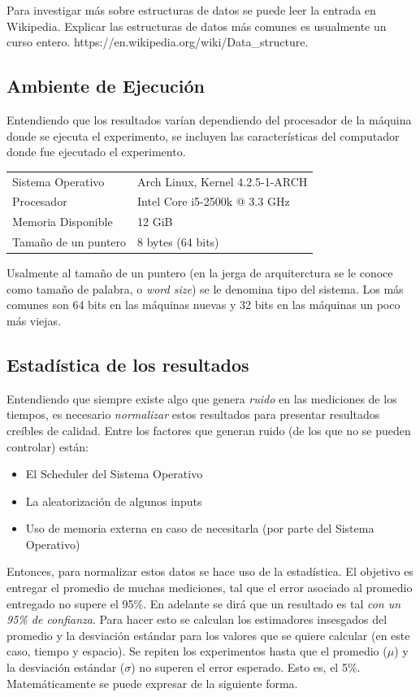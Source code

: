 \documentclass[12pt,letterpaper]{report}
\begin{document}
Para investigar más sobre estructuras de datos se puede leer la entrada en Wikipedia. Explicar las estructuras de datos más comunes es usualmente un curso entero. https://en.wikipedia.org/wiki/Data\_structure.

\subsection{Ambiente de Ejecución}
\label{subsec:ambiente}

Entendiendo que los resultados varían dependiendo del procesador de la máquina donde se ejecuta el experimento, se incluyen las características del computador donde fue ejecutado el experimento.\\

\begin{tabular}{ll}
  Sistema Operativo & Arch Linux, Kernel 4.2.5-1-ARCH\\
  Procesador & Intel Core i5-2500k @ 3.3 GHz\\
  Memoria Disponible & 12 GiB\\
  Tamaño de un puntero & 8 bytes (64 bits)\\
\end{tabular}

Usalmente al tamaño de un puntero (en la jerga de arquiterctura se le conoce como tamaño de palabra, o \emph{word size}) se le denomina tipo del sistema. Los más comunes son 64 bits en las máquinas nuevas y 32 bits en las máquinas un poco más viejas.

\subsection{Estadística de los resultados}
\label{subsec:estadistica}

Entendiendo que siempre existe algo que genera \emph{ruido} en las mediciones de los tiempos, es necesario \emph{normalizar} estos resultados para presentar resultados creíbles de calidad. Entre los factores que generan ruido (de los que no se pueden controlar) están:

\begin{itemize}
\item El Scheduler del Sistema Operativo
\item La aleatorización de algunos inputs
\item Uso de memoria externa en caso de necesitarla (por parte del Sistema Operativo)
\end{itemize}

Entonces, para normalizar estos datos se hace uso de la estadística. El objetivo es entregar el promedio de muchas mediciones, tal que el error asociado al promedio entregado no supere el 95\%. En adelante se dirá que un resultado es tal \emph{con un 95\% de confianza}. Para hacer esto se calculan los estimadores insesgados del promedio y la desviación estándar para los valores que se quiere calcular (en este caso, tiempo y espacio). Se repiten los experimentos hasta que el promedio ($\mu$) y la desviación estándar ($\sigma$) no superen el error esperado. Esto es, el 5\%. Matemáticamente se puede expresar de la siguiente forma.
\end{document}

